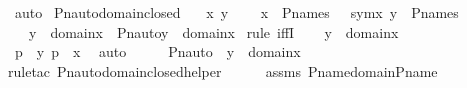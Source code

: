 \begin{isabellebody}
\ auto\isanewline
{}\isamarkupfalse%
%
\endisatagproof
{\isafoldproof}%
%
\isadelimproof
\isanewline
%
\endisadelimproof
\isanewline
{}\isamarkupfalse%
\ Pn{\isacharunderscore}{\kern0pt}auto{\isacharunderscore}{\kern0pt}domain{\isacharunderscore}{\kern0pt}closed{\isacharcolon}{\kern0pt}\isanewline
\ \ \ x\ y\ {\isasympi}\isanewline
\ \ \ {\isachardoublequoteopen}x\ {\isasymin}\ P{\isacharunderscore}{\kern0pt}names{\isachardoublequoteclose}\ {\isachardoublequoteopen}{\isasympi}\ {\isasymin}\ sym{\isacharparenleft}{\kern0pt}x{\isacharparenright}{\kern0pt}{\isachardoublequoteclose}\ {\isachardoublequoteopen}y\ {\isasymin}\ P{\isacharunderscore}{\kern0pt}names{\isachardoublequoteclose}\ \isanewline
\ \ \ {\isachardoublequoteopen}y\ {\isasymin}\ domain{\isacharparenleft}{\kern0pt}x{\isacharparenright}{\kern0pt}\ {\isasymlongleftrightarrow}\ Pn{\isacharunderscore}{\kern0pt}auto{\isacharparenleft}{\kern0pt}{\isasympi}{\isacharparenright}{\kern0pt}{\isacharbackquote}{\kern0pt}y\ {\isasymin}\ domain{\isacharparenleft}{\kern0pt}x{\isacharparenright}{\kern0pt}{\isachardoublequoteclose}\ \isanewline
%
\isadelimproof
%
\endisadelimproof
%
\isatagproof
{}\isamarkupfalse%
{\isacharparenleft}{\kern0pt}rule\ iffI{\isacharparenright}{\kern0pt}\isanewline
\ \ \isamarkupfalse%
\ {\isachardoublequoteopen}y\ {\isasymin}\ domain{\isacharparenleft}{\kern0pt}x{\isacharparenright}{\kern0pt}{\isachardoublequoteclose}\ \isanewline
\ \ \isamarkupfalse%
\ \isamarkupfalse%
\ p\ \ {\isachardoublequoteopen}{\isacharless}{\kern0pt}y{\isacharcomma}{\kern0pt}\ p{\isachargreater}{\kern0pt}\ {\isasymin}\ x{\isachardoublequoteclose}\ \isamarkupfalse%
\ auto\isanewline
\ \ \isamarkupfalse%
\ \isamarkupfalse%
\ {\isachardoublequoteopen}Pn{\isacharunderscore}{\kern0pt}auto{\isacharparenleft}{\kern0pt}{\isasympi}{\isacharparenright}{\kern0pt}\ {\isacharbackquote}{\kern0pt}\ y\ {\isasymin}\ domain{\isacharparenleft}{\kern0pt}x{\isacharparenright}{\kern0pt}{\isachardoublequoteclose}\ \isanewline
\ \ \ \ \isamarkupfalse%
{\isacharparenleft}{\kern0pt}rule{\isacharunderscore}{\kern0pt}tac\ Pn{\isacharunderscore}{\kern0pt}auto{\isacharunderscore}{\kern0pt}domain{\isacharunderscore}{\kern0pt}closed{\isacharunderscore}{\kern0pt}helper{\isacharparenright}{\kern0pt}\isanewline
\ \ \ \ \isamarkupfalse%
\ assms\ P{\isacharunderscore}{\kern0pt}name{\isacharunderscore}{\kern0pt}domain{\isacharunderscore}{\kern0pt}P{\isacharunderscore}{\kern0pt}name\ \isanewline

\end{isabellebody}
